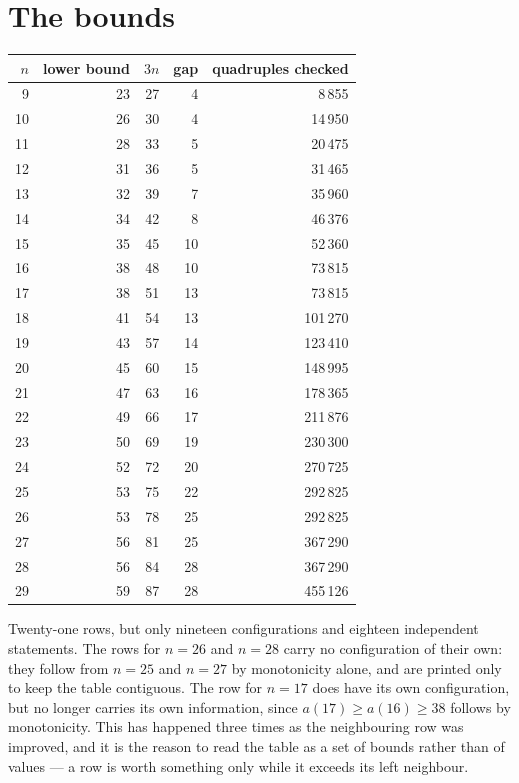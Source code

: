 \documentclass[11pt,a4paper]{article}
\begin{document}
\section{The bounds}
\begin{center}
\begin{tabular}{rrrrr}
\toprule
$n$ & lower bound & $3n$ & gap & quadruples checked \\
\midrule
9 & 23 & 27 & 4 & 8\,855 \\
10 & 26 & 30 & 4 & 14\,950 \\
11 & 28 & 33 & 5 & 20\,475 \\
12 & 31 & 36 & 5 & 31\,465 \\
13 & 32 & 39 & 7 & 35\,960 \\
14 & 34 & 42 & 8 & 46\,376 \\
15 & 35 & 45 & 10 & 52\,360 \\
16 & 38 & 48 & 10 & 73\,815 \\
17 & 38 & 51 & 13 & 73\,815 \\  %
18 & 41 & 54 & 13 & 101\,270 \\
19 & 43 & 57 & 14 & 123\,410 \\
20 & 45 & 60 & 15 & 148\,995 \\
21 & 47 & 63 & 16 & 178\,365 \\
22 & 49 & 66 & 17 & 211\,876 \\
23 & 50 & 69 & 19 & 230\,300 \\
24 & 52 & 72 & 20 & 270\,725 \\
25 & 53 & 75 & 22 & 292\,825 \\
26 & 53 & 78 & 25 & 292\,825 \\  %
27 & 56 & 81 & 25 & 367\,290 \\
28 & 56 & 84 & 28 & 367\,290 \\  %
29 & 59 & 87 & 28 & 455\,126 \\
\bottomrule
\end{tabular}
\end{center}
Twenty-one rows, but only nineteen configurations and eighteen independent statements.  The rows
for $n=26$ and $n=28$ carry no configuration of their own: they follow from $n=25$ and $n=27$ by
monotonicity alone, and are printed only to keep the table contiguous.  The row for $n=17$ does
have its own configuration, but no longer carries its own information, since $a(17)\ge a(16)\ge38$ follows by monotonicity.  This has happened three
times as the neighbouring row was improved, and it is the reason to read the table as a set of
bounds rather than of values --- a row is worth something only while it exceeds its left neighbour.
\end{document}
